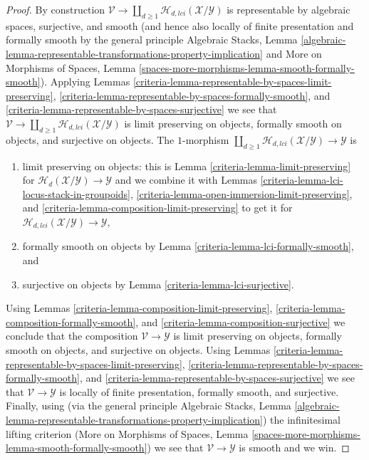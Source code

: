 \begin{proof}
\medskip\noindent
By construction $\mathcal{V} \to
\coprod\nolimits_{d \geq 1} \mathcal{H}_{d, lci}(\mathcal{X}/\mathcal{Y})$
is representable by algebraic spaces, surjective, and smooth (and hence
also locally of finite presentation and formally smooth by the general
principle
Algebraic Stacks, Lemma
\ref{algebraic-lemma-representable-transformations-property-implication}
and
More on Morphisms of Spaces,
Lemma \ref{spaces-more-morphisms-lemma-smooth-formally-smooth}).
Applying
Lemmas \ref{criteria-lemma-representable-by-spaces-limit-preserving},
\ref{criteria-lemma-representable-by-spaces-formally-smooth}, and
\ref{criteria-lemma-representable-by-spaces-surjective}
we see that $\mathcal{V} \to
\coprod\nolimits_{d \geq 1} \mathcal{H}_{d, lci}(\mathcal{X}/\mathcal{Y})$
is limit preserving on objects, formally smooth on objects, and
surjective on objects. The $1$-morphism
$\coprod\nolimits_{d \geq 1} \mathcal{H}_{d, lci}(\mathcal{X}/\mathcal{Y})
\to \mathcal{Y}$ is
\begin{enumerate}
\item limit preserving on objects: this is
Lemma \ref{criteria-lemma-limit-preserving}
for $\mathcal{H}_d(\mathcal{X}/\mathcal{Y}) \to \mathcal{Y}$
and we combine it with Lemmas
\ref{criteria-lemma-lci-locus-stack-in-groupoids},
\ref{criteria-lemma-open-immersion-limit-preserving}, and
\ref{criteria-lemma-composition-limit-preserving}
to get it for $\mathcal{H}_{d, lci}(\mathcal{X}/\mathcal{Y}) \to \mathcal{Y}$,
\item formally smooth on objects by
Lemma \ref{criteria-lemma-lci-formally-smooth},
and
\item surjective on objects by
Lemma \ref{criteria-lemma-lci-surjective}.
\end{enumerate}
Using
Lemmas \ref{criteria-lemma-composition-limit-preserving},
\ref{criteria-lemma-composition-formally-smooth}, and
\ref{criteria-lemma-composition-surjective}
we conclude that the composition $\mathcal{V} \to \mathcal{Y}$ is
limit preserving on objects, formally smooth on objects, and
surjective on objects.
Using
Lemmas \ref{criteria-lemma-representable-by-spaces-limit-preserving},
\ref{criteria-lemma-representable-by-spaces-formally-smooth}, and
\ref{criteria-lemma-representable-by-spaces-surjective}
we see that $\mathcal{V} \to \mathcal{Y}$ is
locally of finite presentation, formally smooth, and surjective.
Finally, using (via the general principle
Algebraic Stacks,
Lemma \ref{algebraic-lemma-representable-transformations-property-implication})
the infinitesimal lifting criterion
(More on Morphisms of Spaces, Lemma
\ref{spaces-more-morphisms-lemma-smooth-formally-smooth})
we see that $\mathcal{V} \to \mathcal{Y}$ is smooth and we win.
\end{proof}

